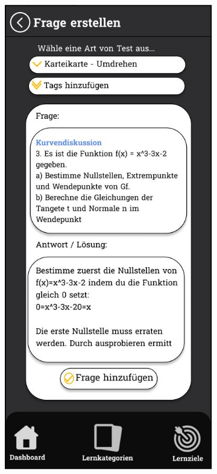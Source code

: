 \newpage

\begin{figure}[htbp]
  \centering
  \begin{subfigure}[b]{0.45\linewidth}
    \centering
    \includegraphics[width=\linewidth]{images/Mockups/FrageErstellen.JPG}

\end{subfigure}
\end{figure}

